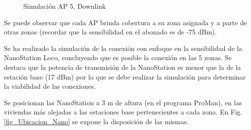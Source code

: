 \documentclass[12pt,a4paper]{book}
\begin{document}
\medskip

\begin{figure}[H]
\centering
{} 
\caption{Simulación AP 5, Downlink}
\label{fig_SimulAP5_acceso}
\end{figure}

\medskip

Se puede observar que cada AP brinda cobertura a su zona asignada y a parte de otras zonas (recordar que la sensibilidad en el abonado es de -75 dBm). 

\medskip

Se ha realizado la simulación de la conexión con enfoque en la sensibilidad de la NanoStation Loco, concluyendo que es posible la conexión en las 5 zonas. Se destaca que la potencia de transmisión de la NanoStation es menor que la de la estación base (17 dBm) por lo que se debe realizar la simulación para determinar la viabilidad de las conexiones. \medskip

Se posicionan las NanoStation a 3 m de altura (en el programa ProMan), en las viviendas más alejadas a las estaciones base pertenecientes a cada zona. En Fig. \ref{fig_Ubicacion_Nano} se expone la disposición de las mismas.\medskip
\end{document}
